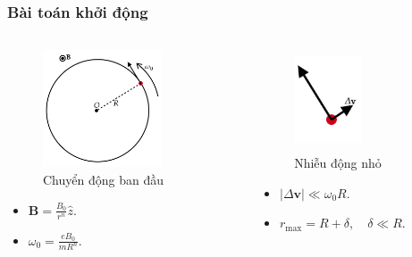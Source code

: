 \begin{frame}
    \frametitle{Bài toán khởi động}
    \begin{columns}
        \begin{column}{0.5\textwidth}
            \vspace{-16pt}

            \begin{figure}
                \centering
                \includegraphics[width=3.5cm, height=3.5cm]{Content/Figure/initial_motion.png}   
                \caption{Chuyển động ban đầu}
            \end{figure}
            \begin{itemize}
                \item  \(\mathbf{B}=\frac{B_0}{r^n}\hat{z}\).
                \item \(\omega_0 =\frac{eB_0}{mR^n}\).
            \end{itemize}
           
        \end{column}
        \begin{column}{0.5\textwidth}
            \vspace{-2pt}

            \begin{figure}
                \centering
                \includegraphics[width=2cm, height=3cm]{Content/Figure/initial_motion2.png}
                \caption{Nhiễu động nhỏ}
            \end{figure}
            \begin{itemize}
                \item \(\lvert\Delta\mathbf{v}\rvert \ll\omega_0 R\).
                \item \(r_{\text{max}}=R+\delta,\quad \delta\ll R\).
            \end{itemize}
        \end{column}
    \end{columns}
\end{frame}
